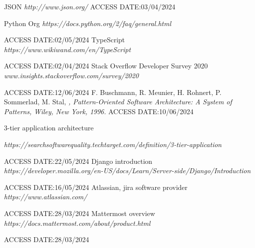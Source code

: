 {
    \begin{thebibliography}{19}
        JSON
        \textit{http://www.json.org/}
        ACCESS DATE:03/04/2024

         Python Org 
        \textit{https://docs.python.org/2/faq/general.html}

ACCESS DATE:02/05/2024
         TypeScript 
        \textit{https://www.wikiwand.com/en/TypeScript}

ACCESS DATE:02/04/2024
         Stack Overflow Developer Survey 2020 
     \textit{www.insights.stackoverflow.com/survey/2020}

ACCESS DATE:12/06/2024
  F. Buschmann, R. Meunier, H. Rohnert, P. Sommerlad, M. Stal,       
 \textit{, Pattern-Oriented Software Architecture: A System of Patterns, Wiley, New York, 1996.}
 ACCESS DATE:10/06/2024

     3-tier application architecture

        \textit{https://searchsoftwarequality.techtarget.com/definition/3-tier-application}

ACCESS DATE:22/05/2024
         Django introduction
        \textit{https://developer.mozilla.org/en-US/docs/Learn/Server-side/Django/Introduction}
        
ACCESS DATE:16/05/2024
        Atlassian, jira software provider 
        \textit{https://www.atlassian.com/}

ACCESS DATE:28/03/2024
Mattermost overview
\textit{https://docs.mattermost.com/about/product.html}

ACCESS DATE:28/03/2024

\end{thebibliography}
}
